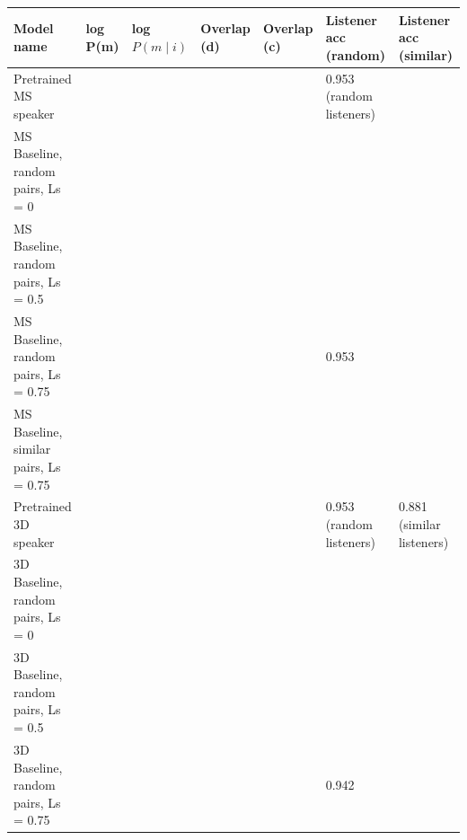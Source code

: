 \begin{table}[]
	\begin{tabularx}{\textwidth}{|X|l|l|X|X|X|X|}
		\hline
		\textbf{Model name}                                    & \textbf{log P(m)} & \textbf{log $P(m \mid i)$} & \textbf{Overlap (d)} & \textbf{Overlap (c)} & \textbf{Listener acc (random)} & \textbf{Listener acc (similar)} \\ \hline
		Pretrained MS speaker                             &                   &                        &                      &                      & 0.953 (random listeners)                 &                                           \\ \hline
		MS Baseline, random pairs, Ls = 0      &                   &                        &                      &                      &                                          &                                           \\ \hline
		MS Baseline, random pairs, Ls = 0.5    &                   &                        &                      &                      &                                          &                                           \\ \hline
		MS Baseline, random pairs, Ls = 0.75   &                   &                        &                      &                      & 0.953                                    &                                           \\ \hline
		MS Baseline, similar pairs, Ls = 0.75  &                   &                        &                      &                      &                                          &                                           \\ \hline
		Pretrained 3D speaker                            &                   &                        &                      &                      & 0.953 (random listeners)                 & 0.881 (similar listeners)                 \\ \hline
		3D Baseline, random pairs, Ls = 0     &                   &                        &                      &                      &                                          &                                           \\ \hline
		3D Baseline, random pairs, Ls = 0.5   &                   &                        &                      &                      &                                          &                                           \\ \hline
		3D Baseline, random pairs, Ls = 0.75  &                   &                        &                      &                      & 0.942                                    &                                           \\ \hline

\end{tabularx}
\end{table}
